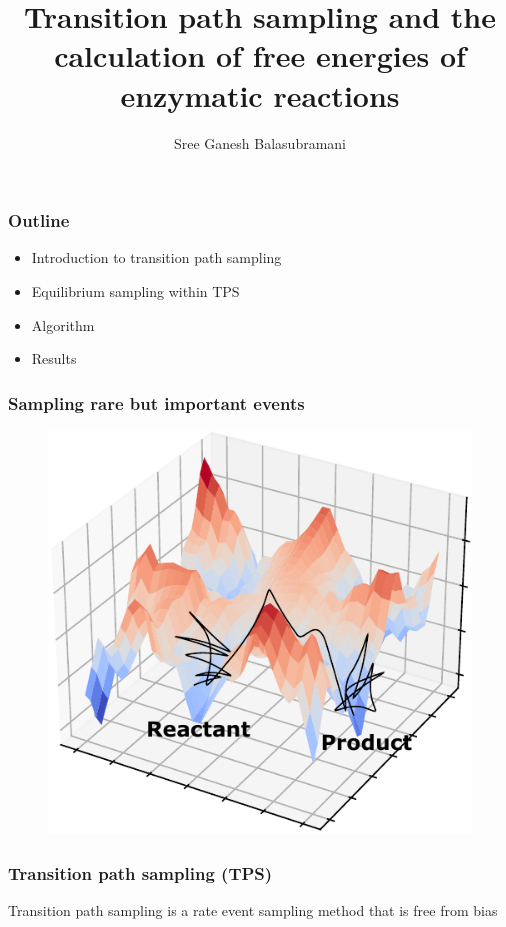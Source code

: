 \documentclass{beamer}
\title[TPS free energies]{Transition path sampling and the calculation of free energies of enzymatic reactions}
\author[Schwartz Group]{Sree Ganesh Balasubramani}
\institute[U of A]{Schwartz Group \\ Chemistry and Biochemistry \\ University of Arizona}
\date{}
\begin{document}
\begin{frame}
  \titlepage
\end{frame}
\begin{frame}
  \frametitle{Outline}
  \begin{itemize}[<+-|alert@+>]
      \item Introduction to transition path sampling 
      \item Equilibrium sampling within TPS
      \item Algorithm 
      \item Results
  \end{itemize}
\end{frame}
\begin{frame}
\frametitle{Sampling rare but important events}
\begin{figure}
\centering
\includegraphics[scale=0.75]{figures/pot-surf.pdf}
\end{figure}
\end{frame}
\begin{frame}
\frametitle{Transition path sampling (TPS)}
Transition path sampling is a rate event sampling method \cite{Bolhuis02AnnRevPhysChem53p291}
that is free from bias
\end{frame}
\end{document}
